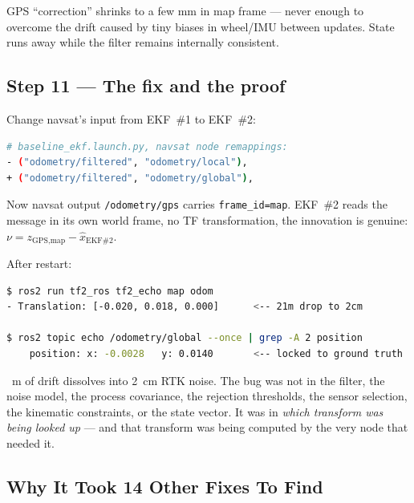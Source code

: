\documentclass[11pt,a4paper]{article}
\begin{document}
\noindent
GPS ``correction'' shrinks to a few mm in map frame --- never enough to overcome the
drift caused by tiny biases in wheel/IMU between updates. State runs away while the filter
remains internally consistent.

\subsection{Step 11 --- The fix and the proof}

Change navsat's input from EKF~\#1 to EKF~\#2:

\begin{lstlisting}[language=bash]
# baseline_ekf.launch.py, navsat node remappings:
- ("odometry/filtered", "odometry/local"),
+ ("odometry/filtered", "odometry/global"),
\end{lstlisting}

\noindent
Now navsat output \texttt{/odometry/gps} carries \texttt{frame\_id=map}. EKF~\#2 reads
the message in its own world frame, no TF transformation, the innovation is genuine:
$\nu = z_{\text{GPS,map}} - \hat{x}_{\text{EKF\#2}}$.

\noindent
After restart:

\begin{lstlisting}[language=bash]
$ ros2 run tf2_ros tf2_echo map odom
- Translation: [-0.020, 0.018, 0.000]      <-- 21m drop to 2cm

$ ros2 topic echo /odometry/global --once | grep -A 2 position
    position: x: -0.0028   y: 0.0140       <-- locked to ground truth
\end{lstlisting}

~m of drift dissolves into 2~cm RTK noise. The bug was not in the filter, the noise model,
the process covariance, the rejection thresholds, the sensor selection, the kinematic
constraints, or the state vector. It was in \emph{which transform was being looked up} ---
and that transform was being computed by the very node that needed it.

\subsection{Why It Took 14 Other Fixes To Find}
\end{document}
